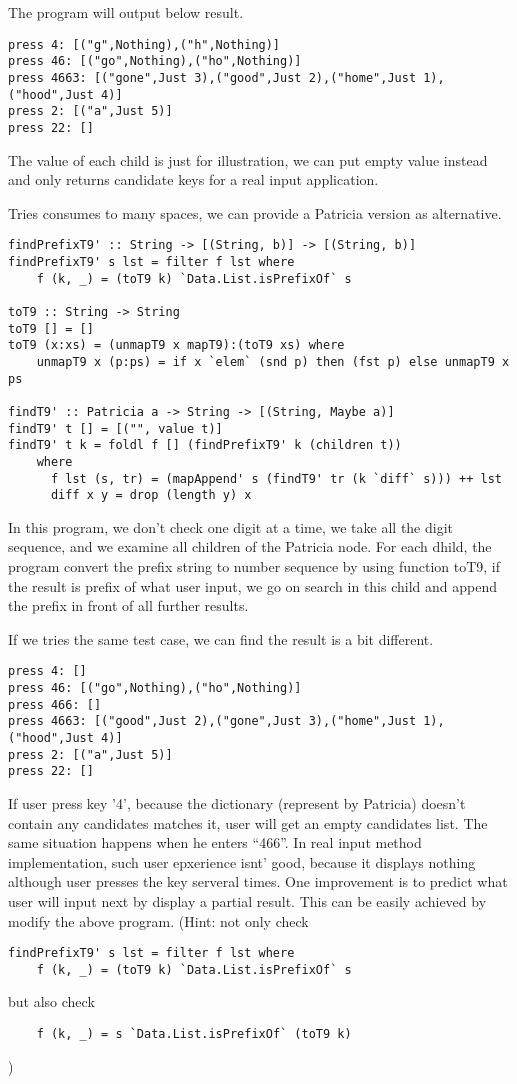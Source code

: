 \documentclass{article}
\begin{document}
The program will output below result.

\begin{verbatim}
press 4: [("g",Nothing),("h",Nothing)]
press 46: [("go",Nothing),("ho",Nothing)]
press 4663: [("gone",Just 3),("good",Just 2),("home",Just 1),("hood",Just 4)]
press 2: [("a",Just 5)]
press 22: []
\end{verbatim}

The value of each child is just for illustration, we can put empty value instead
and only returns candidate keys for a real input application.

Tries consumes to many spaces, we can provide a Patricia version as alternative.

\begin{lstlisting}
findPrefixT9' :: String -> [(String, b)] -> [(String, b)]
findPrefixT9' s lst = filter f lst where
    f (k, _) = (toT9 k) `Data.List.isPrefixOf` s

toT9 :: String -> String
toT9 [] = []
toT9 (x:xs) = (unmapT9 x mapT9):(toT9 xs) where
    unmapT9 x (p:ps) = if x `elem` (snd p) then (fst p) else unmapT9 x ps

findT9' :: Patricia a -> String -> [(String, Maybe a)]
findT9' t [] = [("", value t)]
findT9' t k = foldl f [] (findPrefixT9' k (children t)) 
    where
      f lst (s, tr) = (mapAppend' s (findT9' tr (k `diff` s))) ++ lst
      diff x y = drop (length y) x
\end{lstlisting}

In this program, we don't check one digit at a time, we take all the digit
sequence, and we examine all children of the Patricia node. For each dhild,
the program convert the prefix string to number sequence by using function 
toT9, if the result is prefix of what user input, we go on search in this 
child and append the prefix in front of all further results.

If we tries the same test case, we can find the result is a bit different.

\begin{verbatim}
press 4: []
press 46: [("go",Nothing),("ho",Nothing)]
press 466: []
press 4663: [("good",Just 2),("gone",Just 3),("home",Just 1),("hood",Just 4)]
press 2: [("a",Just 5)]
press 22: []
\end{verbatim}

If user press key '4', because the dictionary (represent by Patricia) doesn't
contain any candidates matches it, user will get an empty candidates list.
The same situation happens when he enters ``466''. In real input method 
implementation, such user epxerience isnt' good, because it displays nothing
although user presses the key serveral times. One improvement is to 
predict what user will input next by display a partial result. This can be 
easily achieved by modify the above program. (Hint: not only check
\begin{lstlisting}
findPrefixT9' s lst = filter f lst where
    f (k, _) = (toT9 k) `Data.List.isPrefixOf` s
\end{lstlisting}
but also check
\begin{lstlisting}
    f (k, _) = s `Data.List.isPrefixOf` (toT9 k)
\end{lstlisting}
)
\end{document}
